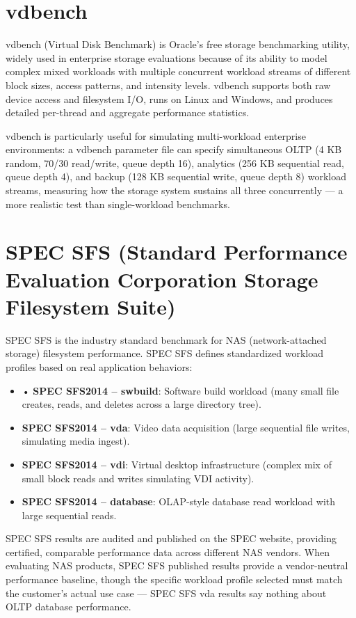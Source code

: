\section{vdbench}
vdbench (Virtual Disk Benchmark) is Oracle's free storage benchmarking utility, widely used in enterprise storage evaluations because of its ability to model complex mixed workloads with multiple concurrent workload streams of different block sizes, access patterns, and intensity levels. vdbench supports both raw device access and filesystem I/O, runs on Linux and Windows, and produces detailed per-thread and aggregate performance statistics.

vdbench is particularly useful for simulating multi-workload enterprise environments: a vdbench parameter file can specify simultaneous OLTP (4 KB random, 70/30 read/write, queue depth 16), analytics (256 KB sequential read, queue depth 4), and backup (128 KB sequential write, queue depth 8) workload streams, measuring how the storage system sustains all three concurrently --- a more realistic test than single-workload benchmarks.

\section{SPEC SFS (Standard Performance Evaluation Corporation Storage Filesystem Suite)}
SPEC SFS is the industry standard benchmark for NAS (network-attached storage) filesystem performance. SPEC SFS defines standardized workload profiles based on real application behaviors:

\begin{itemize}
  \item • \textbf{SPEC SFS2014 -- swbuild}: Software build workload (many small file creates, reads, and deletes across a large directory tree).
  \item \textbf{SPEC SFS2014 -- vda}: Video data acquisition (large sequential file writes, simulating media ingest).
  \item \textbf{SPEC SFS2014 -- vdi}: Virtual desktop infrastructure (complex mix of small block reads and writes simulating VDI activity).
  \item \textbf{SPEC SFS2014 -- database}: OLAP-style database read workload with large sequential reads.
\end{itemize}

SPEC SFS results are audited and published on the SPEC website, providing certified, comparable performance data across different NAS vendors. When evaluating NAS products, SPEC SFS published results provide a vendor-neutral performance baseline, though the specific workload profile selected must match the customer's actual use case --- SPEC SFS vda results say nothing about OLTP database performance.

